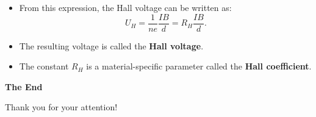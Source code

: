 \documentclass[t,aspectratio=169]{beamer}
\begin{document}
\begin{frame}
\begin{itemize}
\pagebreak
\item From this expression, the Hall voltage can be written as:  
$$U_H = \frac{1}{n e} \frac{I B}{d} = R_H \frac{I B}{d}.$$
\item The resulting voltage is called the \textbf{Hall voltage}.
\item The constant $R_H$ is a material-specific parameter called the \textbf{Hall coefficient}.
\end{itemize}
\end{frame}


\begin{frame}

\vfill
\begin{center}
\textbf{\huge The End}

\bigskip
Thank you for your attention!
\end{center}
\vfill
\end{frame}
\end{document}
